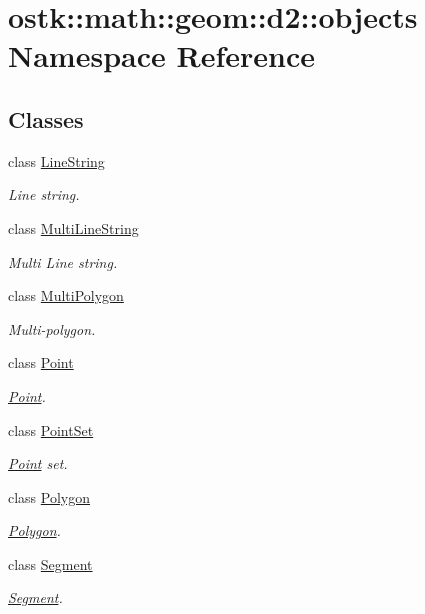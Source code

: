 \hypertarget{namespaceostk_1_1math_1_1geom_1_1d2_1_1objects}{}\section{ostk\+:\+:math\+:\+:geom\+:\+:d2\+:\+:objects Namespace Reference}
\label{namespaceostk_1_1math_1_1geom_1_1d2_1_1objects}
\subsection*{Classes}
\begin{DoxyCompactItemize}
\item 
class \hyperlink{classostk_1_1math_1_1geom_1_1d2_1_1objects_1_1_line_string}{Line\+String}
\begin{DoxyCompactList}\small\item\em Line string. \end{DoxyCompactList}\item 
class \hyperlink{classostk_1_1math_1_1geom_1_1d2_1_1objects_1_1_multi_line_string}{Multi\+Line\+String}
\begin{DoxyCompactList}\small\item\em Multi Line string. \end{DoxyCompactList}\item 
class \hyperlink{classostk_1_1math_1_1geom_1_1d2_1_1objects_1_1_multi_polygon}{Multi\+Polygon}
\begin{DoxyCompactList}\small\item\em Multi-\/polygon. \end{DoxyCompactList}\item 
class \hyperlink{classostk_1_1math_1_1geom_1_1d2_1_1objects_1_1_point}{Point}
\begin{DoxyCompactList}\small\item\em \hyperlink{classostk_1_1math_1_1geom_1_1d2_1_1objects_1_1_point}{Point}. \end{DoxyCompactList}\item 
class \hyperlink{classostk_1_1math_1_1geom_1_1d2_1_1objects_1_1_point_set}{Point\+Set}
\begin{DoxyCompactList}\small\item\em \hyperlink{classostk_1_1math_1_1geom_1_1d2_1_1objects_1_1_point}{Point} set. \end{DoxyCompactList}\item 
class \hyperlink{classostk_1_1math_1_1geom_1_1d2_1_1objects_1_1_polygon}{Polygon}
\begin{DoxyCompactList}\small\item\em \hyperlink{classostk_1_1math_1_1geom_1_1d2_1_1objects_1_1_polygon}{Polygon}. \end{DoxyCompactList}\item 
class \hyperlink{classostk_1_1math_1_1geom_1_1d2_1_1objects_1_1_segment}{Segment}
\begin{DoxyCompactList}\small\item\em \hyperlink{classostk_1_1math_1_1geom_1_1d2_1_1objects_1_1_segment}{Segment}. \end{DoxyCompactList}\end{DoxyCompactItemize}
